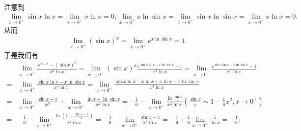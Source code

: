 \documentclass[../../main.tex]{subfiles}%
\begin{document}
\begin{solution}

注意到\begin{align*}
\lim_{x\rightarrow0^{+}}\sin x\ln x=\lim_{x\rightarrow0^{+}}x\ln x = 0, \lim_{x\rightarrow0^{+}}x\ln\sin x=\lim_{x\rightarrow0^{+}}\sin x\ln\sin x=\lim_{x\rightarrow0^{+}}x\ln x = 0.
\end{align*}
从而
\begin{align*}
\lim_{x\rightarrow 0^+} (\sin x)^x=\lim_{x\rightarrow 0^+} e^{x\ln\sin x}=1.
\end{align*}
于是我们有
\begin{align*}
&\lim_{x\rightarrow0^{+}}\frac{x^{\sin x}-(\sin x)^{x}}{x^{3}\ln x}=\lim_{x\rightarrow0^{+}}(\sin x)^{x}\frac{e^{\sin x\ln x - x\ln\sin x}-1}{x^{3}\ln x}=\lim_{x\rightarrow0^{+}}\frac{e^{\sin x\ln x - x\ln\sin x}-1}{x^{3}\ln x}\\
=&\lim_{x\rightarrow0^{+}}\frac{\sin x\ln x - x\ln\sin x}{x^{3}\ln x}=\lim_{x\rightarrow0^{+}}\frac{\sin x\ln x - x\ln x + x\ln x - x\ln\sin x}{x^{3}\ln x}\\
=&\lim_{x\rightarrow0^{+}}\frac{\sin x - x}{x^{3}}+\lim_{x\rightarrow0^{+}}\frac{\ln x - \ln\sin x}{x^{2}\ln x}=-\frac{1}{6}-\lim_{x\rightarrow0^{+}}\frac{\ln\frac{\sin x}{x}}{x^{2}\ln x}(\frac{\sin x}{x}\sim1 - \frac{1}{6}x^{2},x\to 0^+)\\
=&-\frac{1}{6}-\lim_{x\rightarrow0^{+}}\frac{\ln(1 + \frac{\sin x - x}{x})}{x^{2}\ln x}=-\frac{1}{6}-\lim_{x\rightarrow0^{+}}\frac{\sin x - x}{x^{3}\ln x}=-\frac{1}{6}+\frac{1}{6}\lim_{x\rightarrow0^{+}}\frac{1}{\ln x}=-\frac{1}{6}.
\end{align*}

\end{solution}
\end{document}
